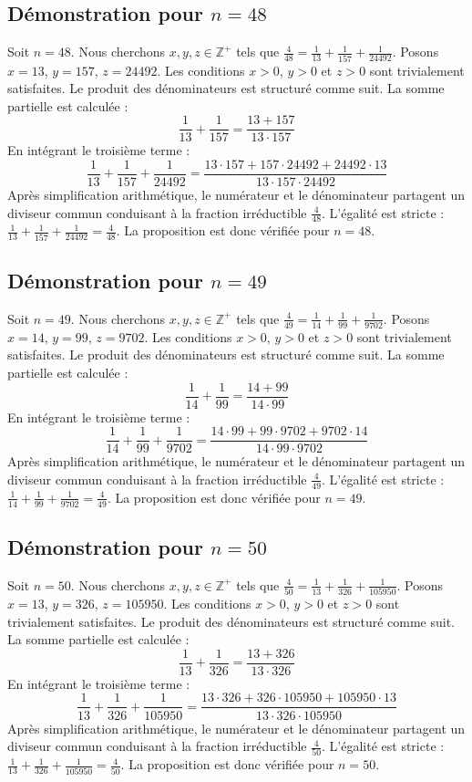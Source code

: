 \documentclass[11pt,a4paper]{article}
\begin{document}
\subsection{Démonstration pour $n = 48$}
Soit $n = 48$. Nous cherchons $x, y, z \in \mathbb{Z}^{+}$ tels que $\frac{4}{48} = \frac{1}{13} + \frac{1}{157} + \frac{1}{24492}$.
Posons $x = 13$, $y = 157$, $z = 24492$.
Les conditions $x > 0$, $y > 0$ et $z > 0$ sont trivialement satisfaites.
Le produit des dénominateurs est structuré comme suit. La somme partielle est calculée :
$$ \frac{1}{13} + \frac{1}{157} = \frac{13+157}{13 \cdot 157} $$
En intégrant le troisième terme :
$$ \frac{1}{13} + \frac{1}{157} + \frac{1}{24492} = \frac{13 \cdot 157 + 157 \cdot 24492 + 24492 \cdot 13}{13 \cdot 157 \cdot 24492} $$
Après simplification arithmétique, le numérateur et le dénominateur partagent un diviseur commun conduisant à la fraction irréductible $\frac{4}{48}$.
L'égalité est stricte : $\frac{1}{13} + \frac{1}{157} + \frac{1}{24492} = \frac{4}{48}$.
La proposition est donc vérifiée pour $n = 48$.
\subsection{Démonstration pour $n = 49$}
Soit $n = 49$. Nous cherchons $x, y, z \in \mathbb{Z}^{+}$ tels que $\frac{4}{49} = \frac{1}{14} + \frac{1}{99} + \frac{1}{9702}$.
Posons $x = 14$, $y = 99$, $z = 9702$.
Les conditions $x > 0$, $y > 0$ et $z > 0$ sont trivialement satisfaites.
Le produit des dénominateurs est structuré comme suit. La somme partielle est calculée :
$$ \frac{1}{14} + \frac{1}{99} = \frac{14+99}{14 \cdot 99} $$
En intégrant le troisième terme :
$$ \frac{1}{14} + \frac{1}{99} + \frac{1}{9702} = \frac{14 \cdot 99 + 99 \cdot 9702 + 9702 \cdot 14}{14 \cdot 99 \cdot 9702} $$
Après simplification arithmétique, le numérateur et le dénominateur partagent un diviseur commun conduisant à la fraction irréductible $\frac{4}{49}$.
L'égalité est stricte : $\frac{1}{14} + \frac{1}{99} + \frac{1}{9702} = \frac{4}{49}$.
La proposition est donc vérifiée pour $n = 49$.
\subsection{Démonstration pour $n = 50$}
Soit $n = 50$. Nous cherchons $x, y, z \in \mathbb{Z}^{+}$ tels que $\frac{4}{50} = \frac{1}{13} + \frac{1}{326} + \frac{1}{105950}$.
Posons $x = 13$, $y = 326$, $z = 105950$.
Les conditions $x > 0$, $y > 0$ et $z > 0$ sont trivialement satisfaites.
Le produit des dénominateurs est structuré comme suit. La somme partielle est calculée :
$$ \frac{1}{13} + \frac{1}{326} = \frac{13+326}{13 \cdot 326} $$
En intégrant le troisième terme :
$$ \frac{1}{13} + \frac{1}{326} + \frac{1}{105950} = \frac{13 \cdot 326 + 326 \cdot 105950 + 105950 \cdot 13}{13 \cdot 326 \cdot 105950} $$
Après simplification arithmétique, le numérateur et le dénominateur partagent un diviseur commun conduisant à la fraction irréductible $\frac{4}{50}$.
L'égalité est stricte : $\frac{1}{13} + \frac{1}{326} + \frac{1}{105950} = \frac{4}{50}$.
La proposition est donc vérifiée pour $n = 50$.
\end{document}
